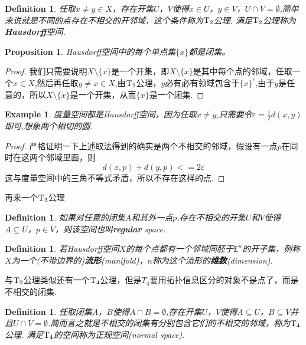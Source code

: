 \documentclass{article}
\newtheorem{proposition}[theorem]{Proposition}
\newtheorem{example}[theorem]{Example}
\newtheorem{definition}[theorem]{Definition}
\begin{document}
\begin{definition}
任取$x \neq y \in X$，存在开集$U$，$V$使得$x \in U$，$y \in V$，$U \cap V = \emptyset$,简单来说就是不同的点存在不相交的开邻域，这个条件称为$\rm T_2$公理. 满足$\rm T_2$公理称为\rm\textbf{Hausdorff}空间.
\end{definition}

\begin{proposition}
\rm Hausdorff空间中的每个单点集$\{x\}$都是闭集。
\end{proposition}

\begin{proof}
我们只需要说明$X \setminus \{x\}$是一个开集，即$X \setminus \{x\}$是其中每个点的邻域，任取一个$x \in X$,然后再任取$y \neq x \in X$,由$\rm T_2$公理，$y$必有必有领域包含于$\{x\}^c$,由于$y$是任意的，所以$X \setminus \{x\}$是一个开集，从而$\{x\}$是一个闭集.
\end{proof}

\begin{example}
度量空间都是\rm Hausdorff空间，因为任取$x \neq y$,只需要令$\varepsilon = \frac{1}{2}d(x,y)$即可,想象两个相切的圆.
\end{example}

\begin{proof}
严格证明一下上述取法得到的确实是两个不相交的邻域，假设有一点$p$在同时在这两个邻域里面，则\[d(x,p) + d(y,p) <= 2\varepsilon\]这与度量空间中的三角不等式矛盾，所以不存在这样的点.
\end{proof}

再来一个$\rm T_3$公理

\begin{definition}
如果对任意的闭集$A$和其外一点$p$,存在不相交的开集$U$和$V$使得$A \subseteq U$，$p \in V$，则该空间也叫\rm \textbf{regular} space.
\end{definition}

\begin{definition}
若\rm Hausdorff空间$X$的每个点都有一个邻域同胚于$\mathbb{E}^n$的开子集，则称$X$为一个(不带边界的)\textbf{流形}(manifold)，$n$称为这个流形的\textbf{维数}(\rm dimension).
\end{definition}


与$\rm T_2$公理类似还有一个$\rm T_4$公理，但是$T_4$要用拓扑信息区分的对象不是点了，而是不相交的闭集.

\begin{definition}
任取闭集$A$，$B$使得$A \cap B = \emptyset$,存在开集$U$，$V$使得$A \subseteq U$，$B \subseteq V$并且$U \cap V = \emptyset$.简而言之就是不相交的闭集有分别包含它们的不相交的邻域，称为$\rm T_4$公理. 满足$\rm T_4$的空间称为\textsf{正规空间}(\rm normal space).
\end{definition}
\end{document}
